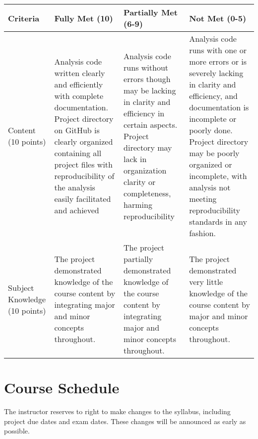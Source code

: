 \documentclass[11pt]{article}
\begin{document}
\begin{itemize}
\begin{center}
\begin{tabular}{m{9em}|m{10em}|m{10em}|m{10em}}
Criteria & Fully Met (10) & Partially Met (6-9) & Not Met (0-5)\\
\hline
Content (10 points) & Analysis code written clearly and efficiently with complete documentation.  Project directory on GitHub is clearly organized containing all project files with reproducibility of the analysis easily facilitated and achieved & Analysis code runs without errors though may be lacking in clarity and efficiency in certain aspects.  Project directory may lack in organization clarity or completeness, harming reproducibility & Analysis code runs with one or more errors or is severely lacking in clarity and efficiency, and documentation is incomplete or poorly done.  Project directory may be poorly organized or incomplete, with analysis not meeting reproducibility standards in any fashion.\\
\hline
Subject Knowledge (10 points) & The project demonstrated knowledge of the course content by integrating major and minor concepts throughout. & The project partially demonstrated knowledge of the course content by integrating major and minor concepts throughout. & The project demonstrated very little knowledge of the course content by major and minor concepts throughout.\\
\end{tabular}
\end{center}
\end{itemize}

\section*{Course Schedule}
The instructor reserves to right to make changes to the syllabus, including project due dates and exam dates. These changes will be announced as early as possible. 
\end{document}
